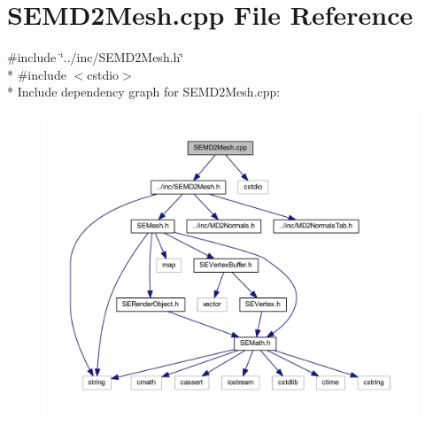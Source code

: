 \section{S\+E\+M\+D2\+Mesh.\+cpp File Reference}
\label{_s_e_m_d2_mesh_8cpp}
{\ttfamily \#include \char`\"{}../inc/\+S\+E\+M\+D2\+Mesh.\+h\char`\"{}}\\*
{\ttfamily \#include $<$cstdio$>$}\\*
Include dependency graph for S\+E\+M\+D2\+Mesh.\+cpp\+:
\nopagebreak
\begin{figure}[H]
\begin{center}
\leavevmode
\includegraphics[width=350pt]{_s_e_m_d2_mesh_8cpp__incl}
\end{center}
\end{figure}
